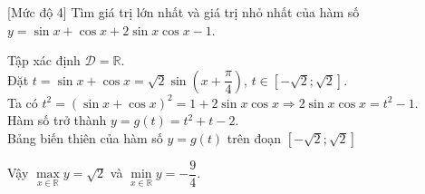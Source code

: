 \begin{bt}%
	[Mức độ 4]
	Tìm giá trị lớn nhất và giá trị nhỏ nhất của hàm số $y=\sin x+\cos x+2 \sin x \cos x-1$.
	\loigiai
	{
		Tập xác định $\mathscr{D}=\mathbb{R}$.\\
		Đặt $t=\sin x+ \cos x=\sqrt{2}\sin \left(x+\dfrac{\pi}{4}\right)$, $t\in \left[-\sqrt{2};\sqrt{2}\right]$.\\
		Ta có $t^2=\left(\sin x+ \cos x\right)^2=1+2\sin x\cos x\Rightarrow 2\sin x\cos x =t^2-1$.\\
		Hàm số trở thành $y=g(t)=t^2+t-2$. \\
		Bảng biến thiên của hàm số $y=g(t)$ trên đoạn $ \left[-\sqrt{2};\sqrt{2}\right]$
		\begin{center}
		\end{center}
		Vậy $\max\limits_{x \in \mathbb{R}} y=\sqrt{2}$ và $\min\limits_{x \in \mathbb{R}} y=-\dfrac{9}{4}$.
	}
\end{bt}

